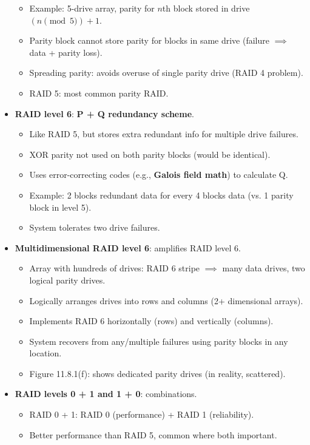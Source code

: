 \begin{itemize}
\begin{itemize}
        \item Example: 5-drive array, parity for $n$th block stored in drive $(n \pmod 5) + 1$.
        \item Parity block cannot store parity for blocks in same drive (failure $\implies$ data + parity loss).
        \item Spreading parity: avoids overuse of single parity drive (RAID 4 problem).
        \item RAID 5: most common parity RAID.
    \end{itemize}
    \item \textbf{RAID level 6}: \textbf{P + Q redundancy scheme}.
    \begin{itemize}
        \item Like RAID 5, but stores extra redundant info for multiple drive failures.
        \item XOR parity not used on both parity blocks (would be identical).
        \item Uses error-correcting codes (e.g., \textbf{Galois field math}) to calculate Q.
        \item Example: 2 blocks redundant data for every 4 blocks data (vs. 1 parity block in level 5).
        \item System tolerates two drive failures.
    \end{itemize}
    \item \textbf{Multidimensional RAID level 6}: amplifies RAID level 6.
    \begin{itemize}
        \item Array with hundreds of drives: RAID 6 stripe $\implies$ many data drives, two logical parity drives.
        \item Logically arranges drives into rows and columns (2+ dimensional arrays).
        \item Implements RAID 6 horizontally (rows) and vertically (columns).
        \item System recovers from any/multiple failures using parity blocks in any location.
        \item Figure 11.8.1(f): shows dedicated parity drives (in reality, scattered).
    \end{itemize}
    \item \textbf{RAID levels 0 + 1 and 1 + 0}: combinations.
    \begin{itemize}
        \item RAID 0 + 1: RAID 0 (performance) + RAID 1 (reliability).
        \item Better performance than RAID 5, common where both important.

\end{itemize}
\end{itemize}
